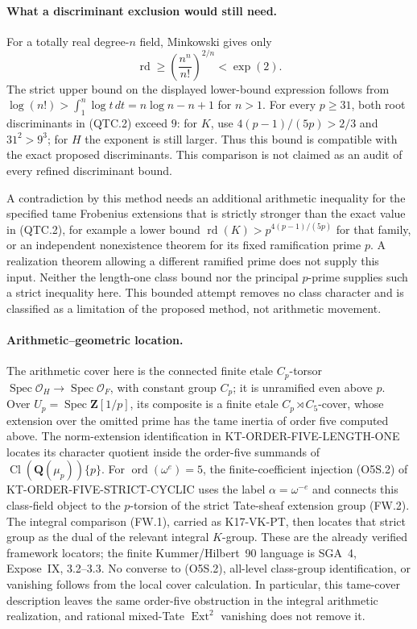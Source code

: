 \paragraph{What a discriminant exclusion would still need.}
For a totally real degree-$n$ field, Minkowski gives only
\[
 \operatorname{rd}\ge
       \left(\frac{n^n}{n!}\right)^{2/n}<\exp(2).      \tag{QTC.6}
\]
The strict upper bound on the displayed lower-bound expression follows
from $\log(n!)>\int_1^n\log t\,dt=n\log n-n+1$ for $n>1$.
For every $p\ge31$, both root discriminants in (QTC.2) exceed $9$:
for $K$, use $4(p-1)/(5p)>2/3$ and $31^2>9^3$; for $H$
the exponent is still larger.  Thus this bound is compatible with
the exact proposed discriminants.  This comparison is not claimed
as an audit of every refined discriminant bound.

A contradiction by this method needs an additional arithmetic
inequality for the specified tame Frobenius extensions that is
strictly stronger than the exact value in (QTC.2), for example a
lower bound $\operatorname{rd}(K)>p^{4(p-1)/(5p)}$ for that family,
or an independent nonexistence theorem for its fixed ramification
prime $p$.  A realization theorem allowing a different ramified prime
does not supply this input.  Neither the length-one class bound nor
the principal $p$-prime supplies such a strict inequality here.
This bounded attempt removes no class character and is classified
as a limitation of the proposed method, not arithmetic movement.

\paragraph{Arithmetic--geometric location.}
The arithmetic cover here is the connected finite etale $C_p$-torsor
$\operatorname{Spec}\mathcal O_H\to\operatorname{Spec}\mathcal O_F$,
with constant group $C_p$; it is unramified even above $p$.
Over $U_p=\operatorname{Spec}\mathbf Z[1/p]$, its composite is a
finite etale $C_p\rtimes C_5$-cover, whose extension over the omitted
prime has the tame inertia of order five computed above.
The norm-extension identification in KT-ORDER-FIVE-LENGTH-ONE
locates its character quotient inside the order-five summands of
$\operatorname{Cl}(\mathbf Q(\mu_p))\{p\}$.
For $\operatorname{ord}(\omega^e)=5$, the finite-coefficient injection
(O5S.2) of KT-ORDER-FIVE-STRICT-CYCLIC uses the label
$\alpha=\omega^{-e}$ and connects this class-field object to the
$p$-torsion of the strict Tate-sheaf extension group (FW.2).
The integral comparison (FW.1), carried as K17-VK-PT, then locates
that strict group as the dual of the relevant integral $K$-group.
These are the already verified framework locators; the finite
Kummer/Hilbert~90 language is SGA~4, Expose~IX, 3.2--3.3.
No converse to (O5S.2), all-level class-group identification, or
vanishing follows from the local cover calculation.  In particular,
this tame-cover description leaves the same order-five obstruction
in the integral arithmetic realization, and rational mixed-Tate
$\operatorname{Ext}^2$ vanishing does not remove it.

